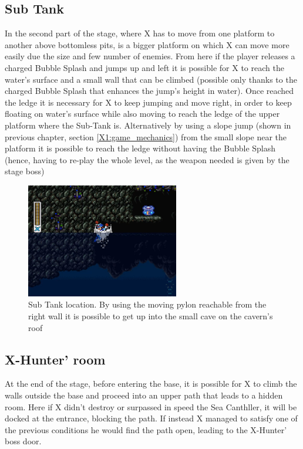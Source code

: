 \subsection{Sub Tank}
In the second part of the stage, where X has to move from one platform to another above bottomless pits, is a bigger platform on which X can move more easily due the size and few number of enemies. From here if the player releases a charged Bubble Splash and jumps up and left it is possible for X to reach the water's surface and a small wall that can be climbed (possible only thanks to the charged Bubble Splash that enhances the jump's height in water). Once reached the ledge it is necessary for X to keep jumping and move right, in order to keep floating on water's surface while also moving to reach the ledge of the upper platform where the Sub-Tank is. Alternatively by using a slope jump (shown in previous chapter, section \ref{X1:game_mechanics}) from the small slope near the platform it is possible to reach the ledge without having the Bubble Splash (hence, having to re-play the whole level, as the weapon needed is given by the stage boss)
\begin{figure}[htp]
	\centering
	\includegraphics[height=5cm]{figures/X2/Bubble_crab/Crab_tank.png}
	\caption{Sub Tank location. By using the moving pylon reachable from the right wall it is possible to get up into the small cave on the cavern's roof}
\end{figure}


\subsection{X-Hunter' room}
At the end of the stage, before entering the base, it is possible for X to climb the walls outside the base and proceed into an upper path that leads to a hidden room. Here if X didn't destroy or surpassed in speed the Sea Canthller, it will be docked at the entrance, blocking the path. If instead X managed to satisfy one of the previous conditions he would find the path open, leading to the X-Hunter' boss door.

